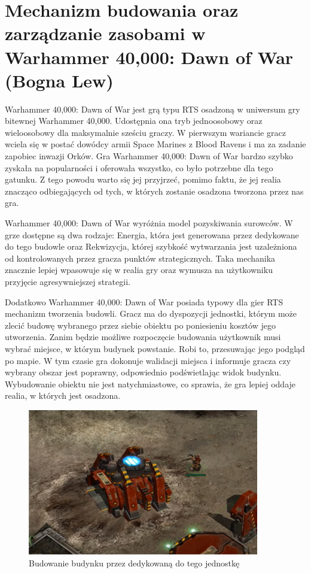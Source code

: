 \section{Mechanizm budowania oraz zarządzanie zasobami w Warhammer 40,000: Dawn of War (Bogna Lew)}

Warhammer 40,000: Dawn of War jest grą typu RTS osadzoną w uniwersum gry bitewnej Warhammer 40,000. Udostępnia
ona tryb jednoosobowy oraz wieloosobowy dla maksymalnie sześciu graczy. W pierwszym wariancie gracz wciela się w postać dowódcy
armii Space Marines z Blood Ravens i ma za zadanie zapobiec inwazji Orków. Gra Warhammer 40,000: Dawn of War bardzo szybko
zyskała na popularności i oferowała wszystko, co było potrzebne dla tego gatunku. Z tego powodu warto się jej przyjrzeć,
pomimo faktu, że jej realia znacząco odbiegających od tych, w których zostanie osadzona tworzona przez nas gra.

Warhammer 40,000: Dawn of War wyróżnia model pozyskiwania surowców. W grze dostępne są dwa rodzaje: Energia, która jest
generowana przez dedykowane do tego budowle oraz Rekwizycja, której szybkość wytwarzania jest uzależniona od kontrolowanych
przez gracza punktów strategicznych. Taka mechanika znacznie lepiej wpasowuje się w realia gry oraz wymusza na użytkowniku
przyjęcie agresywniejszej strategii.

Dodatkowo Warhammer 40,000: Dawn of War posiada typowy dla gier RTS mechanizm tworzenia budowli. Gracz ma
do dyspozycji jednostki, którym może zlecić budowę wybranego przez siebie obiektu po poniesieniu kosztów jego utworzenia.
Zanim będzie możliwe rozpoczęcie budowania użytkownik musi wybrać miejsce, w którym budynek powstanie. Robi to, przesuwając
jego podgląd po mapie. W tym czasie gra dokonuje walidacji miejsca i informuje gracza czy wybrany obszar jest poprawny,
odpowiednio podświetlając widok budynku. Wybudowanie obiektu nie jest natychmiastowe, co sprawia, że gra lepiej oddaje
realia, w których jest osadzona.

\begin{figure}[h!]
    \centering
    \includegraphics[width=0.9\textwidth]{images/warhammer.png}
    \caption{Budowanie budynku przez dedykowaną do tego jednostkę}
\end{figure}